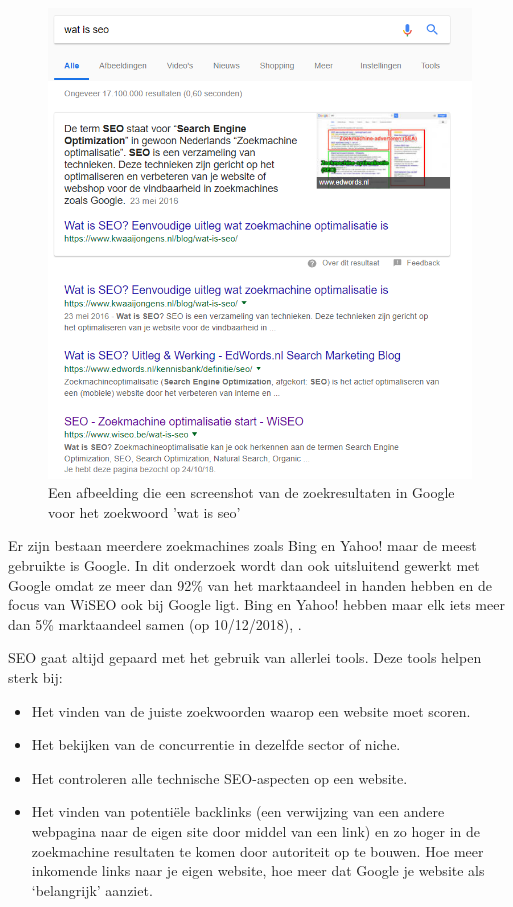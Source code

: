 \begin{figure}[h!]
\centering
\includegraphics[width=\linewidth]{Bachelorproef/bachelor/img/watisseo.png}
\caption{Een afbeelding die een screenshot van de zoekresultaten in Google voor het zoekwoord 'wat is seo' \autocite{google.be}}
\end{figure}

Er zijn bestaan meerdere zoekmachines zoals Bing en Yahoo! maar de meest gebruikte is Google. In dit onderzoek wordt dan ook uitsluitend gewerkt met Google omdat ze meer dan 92\% van het marktaandeel in handen hebben en de focus van WiSEO ook bij Google ligt. Bing en Yahoo! hebben maar elk iets meer dan 5\% marktaandeel samen (op 10/12/2018),          
\textcite{ZOEKMACHINES} .

SEO gaat altijd gepaard met het gebruik van allerlei tools. Deze tools helpen sterk bij: 
\begin{itemize}
\item Het vinden van de juiste zoekwoorden waarop een website moet scoren.
\item Het bekijken van de concurrentie in dezelfde sector of niche.
\item Het controleren alle technische SEO-aspecten op een website.
\item Het vinden van potentiële backlinks (een verwijzing van een andere webpagina naar de eigen site door middel van een link) en zo hoger in de zoekmachine resultaten te komen door autoriteit op te bouwen. Hoe meer inkomende links naar je eigen website, hoe meer dat Google je website als ‘belangrijk’ aanziet. 
\end{itemize}

